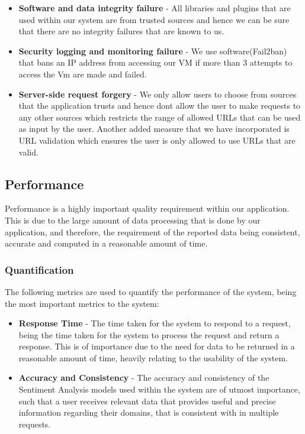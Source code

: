\documentclass[12pt]{article}
\begin{document}
\begin{itemize}
    \item \textbf{Software and data integrity failure} - All libraries and plugins that are used within our system are from trusted sources and hence we can be sure that there are no integrity failures that are known to us.
    \item \textbf{Security logging and monitoring failure} - We use software(Fail2ban) that bans an IP address from accessing our VM if more than 3 attempts to access the Vm are made and failed.
    \item \textbf{Server-side request forgery} - We only allow users to choose from sources that the application trusts and hence dont allow the user to make requests to any other sources which restricts the range of allowed URLs that can be used as input by the user. Another added measure that we have incorporated is URL validation which ensures the user is only allowed to use URLs that are valid.
\end{itemize}
\newpage
\subsection{Performance}
Performance is a highly important quality requirement within our application. This is due to the large amount of data processing that is done by our application, and therefore, the requirement of the reported data being consistent, accurate and computed in a reasonable amount of time.
\subsubsection{Quantification}
The following metrics are used to quantify the performance of the system, being the most important metrics to the system:
\begin{itemize}
    \item \textbf{Response Time} - The time taken for the system to respond to a request, being the time taken for the system to process the request and return a response. This is of importance due to the need for data to be returned in a reasonable amount of time, heavily relating to the usability of the system.
    \item \textbf{Accuracy and Consistency} - The accuracy and consistency of the Sentiment Analysis models used within the system are of utmost importance, such that a user receives relevant data that provides useful and precise information regarding their domains, that is consistent with in multiple requests.
\end{itemize}
\end{document}
